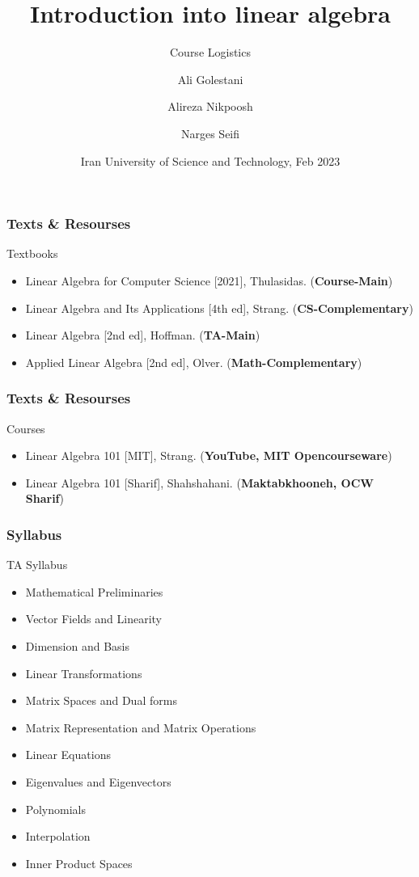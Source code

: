 \documentclass{beamer}
\title[Linear Algebra 101] %
{Introduction into linear algebra}
\subtitle{Course Logistics}
\author[Golestani, Nikpoosh, Seifi]{Ali Golestani \inst{1} \and Alireza Nikpoosh \inst{2} \and Narges Seifi \inst{3}}
\institute[IUST] %
{
  \inst{}%
  Department of Mathematics\\
  Iran University of Science and Technology
}
\date[IUST 2023] %
{Iran University of Science and Technology, Feb 2023}
\begin{document}
\frame{\titlepage}


\begin{frame}
\frametitle{Texts \& Resourses}
   \begin{block}{Textbooks}
    \begin{itemize}
      \item Linear Algebra for Computer Science [2021], Thulasidas. (\textbf{Course-Main})
      \item Linear Algebra and Its Applications [4th ed], Strang. (\textbf{CS-Complementary})
      \item Linear Algebra [2nd ed], Hoffman. (\textbf{TA-Main})
      \item Applied Linear Algebra [2nd ed], Olver. (\textbf{Math-Complementary})
    \end{itemize}
   \end{block}
\end{frame}

\begin{frame}
  \frametitle{Texts \& Resourses}
     \begin{block}{Courses}
      \begin{itemize}
        \item Linear Algebra 101 [MIT], Strang. (\textbf{YouTube, MIT Opencourseware})
        \item Linear Algebra 101 [Sharif], Shahshahani. (\textbf{Maktabkhooneh, OCW Sharif})
      \end{itemize}
     \end{block}
  \end{frame}

\begin{frame}
  \frametitle{Syllabus}
  \begin{alertblock}{TA Syllabus}
    \begin{itemize}
      \item Mathematical Preliminaries
      \item Vector Fields and Linearity
      \item Dimension and Basis
      \item Linear Transformations
      \item Matrix Spaces and Dual forms
      \item Matrix Representation and Matrix Operations
      \item Linear Equations
      \item Eigenvalues and Eigenvectors
      \item Polynomials
      \item Interpolation
      \item Inner Product Spaces
    \end{itemize}
  \end{alertblock}
\end{frame}
\end{document}
